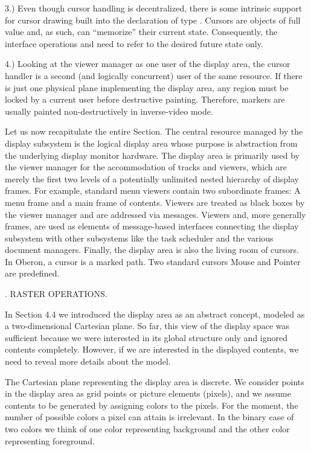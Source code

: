 3.) Even though cursor handling is decentralized, there is some intrinsic support for cursor drawing built into the declaration of type . Cursors are objects of full value and, as such, can ``memorize'' their current state. Consequently, the interface operations  and  need to refer to the desired future state only.

4.) Looking at the viewer manager as one user of the display area, the cursor handler is a second (and logically concurrent) user of the same resource. If there is just one physical plane implementing the display area, any region must be locked by a current user before destructive painting. Therefore, markers are usually painted non-destructively in inverse-video mode.

Let us now recapitulate the entire Section. The central resource
managed by the display subsystem is the logical display area whose
purpose is abstraction from the underlying display monitor
hardware. The display area is primarily used by the viewer manager for
the accommodation of tracks and viewers, which are merely the first
two levels of a potentially unlimited nested hierarchy of display
frames. For example, standard menu viewers contain two subordinate
frames: A menu frame and a main frame of contents. Viewers are treated
as black boxes by the viewer manager and are addressed via
messages. Viewers and, more generally frames, are used as elements of
message-based interfaces connecting the display subsystem with other
subsystems like the task scheduler and the various document
managers. Finally, the display area is also the living room of
cursors. In Oberon, a cursor is a marked path. Two standard cursors
Mouse and Pointer are predefined.

. RASTER OPERATIONS.

In Section 4.4 we introduced the display area as an abstract concept,
modeled as a two-dimensional Cartesian plane. So far, this view of
the display space was sufficient because we were interested in its
global structure only and ignored contents completely. However, if we
are interested in the displayed contents, we need to reveal more
details about the model.

The Cartesian plane representing the display area is discrete. We
consider points in the display area as grid points or picture elements
(pixels), and we assume contents to be generated by assigning colors
to the pixels. For the moment, the number of possible colors a pixel
can attain is irrelevant. In the binary case of two colors we think of
one color representing background and the other color representing
foreground.

